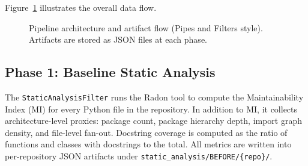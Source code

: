 \documentclass[runningheads]{llncs}
\begin{document}
Figure~\ref{fig:pipeline_arch} illustrates the overall data flow.

\begin{figure}[H]
\centering
{}
\caption{Pipeline architecture and artifact flow (Pipes and Filters style). Artifacts are stored as JSON files at each phase.}
\label{fig:pipeline_arch}
\end{figure}

\subsection{Phase 1: Baseline Static Analysis}

The \texttt{StaticAnalysisFilter} runs the Radon tool to compute the Maintainability Index (MI) for every Python file in the repository. In addition to MI, it collects architecture-level proxies: package count, package hierarchy depth, import graph density, and file-level fan-out. Docstring coverage is computed as the ratio of functions and classes with docstrings to the total. All metrics are written into per-repository JSON artifacts under \texttt{static\_analysis/BEFORE/\{repo\}/}.
\end{document}
